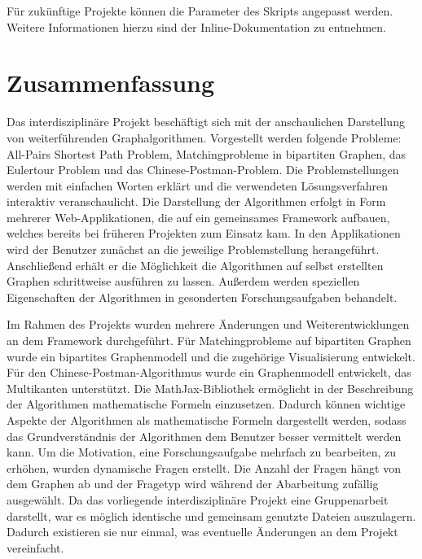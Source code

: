 Für zukünftige Projekte können die Parameter des Skripts angepasst werden. Weitere Informationen hierzu sind der Inline-Dokumentation zu entnehmen.

\chapter{Zusammenfassung}
Das interdisziplinäre Projekt beschäftigt sich mit der anschaulichen Darstellung von weiterführenden Graphalgorithmen. Vorgestellt werden folgende Probleme: All-Pairs Shortest Path Problem, Matchingprobleme in bipartiten Graphen, das Eulertour Problem und das Chinese-Postman-Problem. 
Die Problemstellungen werden mit einfachen Worten erklärt und die verwendeten Lösungsverfahren interaktiv veranschaulicht. Die Darstellung der Algorithmen erfolgt in Form mehrerer Web-Applikationen, die auf ein gemeinsames Framework aufbauen, welches bereits bei früheren Projekten zum Einsatz kam. In den Applikationen wird der Benutzer zunächst an die jeweilige Problemstellung herangeführt. Anschließend erhält er die Möglichkeit die Algorithmen auf selbst erstellten Graphen schrittweise ausführen zu lassen. Außerdem werden speziellen Eigenschaften der Algorithmen in gesonderten Forschungsaufgaben behandelt. 

Im Rahmen des Projekts wurden mehrere Änderungen und Weiterentwicklungen an dem Framework durchgeführt. Für Matchingprobleme auf bipartiten Graphen wurde ein bipartites Graphenmodell und die zugehörige Visualisierung entwickelt. Für den Chinese-Postman-Algorithmus wurde ein Graphenmodell entwickelt, das Multikanten unterstützt. 
Die MathJax-Bibliothek ermöglicht in der Beschreibung der Algorithmen mathematische Formeln einzusetzen. Dadurch können wichtige Aspekte der Algorithmen als mathematische Formeln dargestellt werden, sodass das Grundverständnis der Algorithmen dem Benutzer besser vermittelt werden kann.
Um die Motivation, eine Forschungsaufgabe mehrfach zu bearbeiten, zu erhöhen, wurden dynamische Fragen erstellt. Die Anzahl der Fragen hängt von dem Graphen ab und der Fragetyp wird während der Abarbeitung zufällig ausgewählt. Da das vorliegende interdisziplinäre Projekt eine Gruppenarbeit darstellt, war es möglich identische und gemeinsam genutzte Dateien auszulagern. Dadurch existieren sie nur einmal, was eventuelle Änderungen an dem Projekt vereinfacht.
